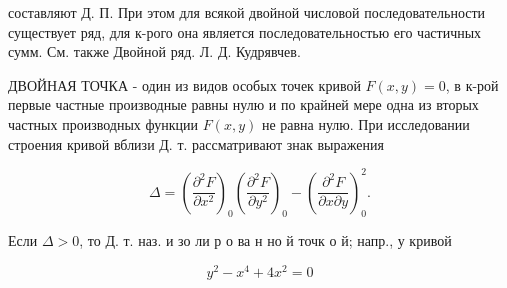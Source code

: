 \documentclass[10pt]{article}
\begin{document}
составляют Д. П. При этом для всякой двойной числовой последовательности существует ряд, для к-рого она является последовательностью его частичных сумм. См. также Двойной ряд. Л. Д. Кудрявчев.



ДВОЙНАЯ ТОЧКА - один из видов особых точек кривой $F(x, y)=0$, в к-рой первые частные производные равны нулю и по крайней мере одна из вторых частных производных функции $F(x, y)$ не равна нулю. При исследовании строения кривой вблизи Д. т. рассматривают знак выражения



\[

\Delta=\left(\frac{\partial^{2} F}{\partial x^{2}}\right)_{0}\left(\frac{\partial^{2} F}{\partial y^{2}}\right)_{0}-\left(\frac{\partial^{2} F}{\partial x \partial y}\right)_{0}^{2} .

\]



Если $\Delta>0$, то Д. т. наз. и зо ли р о ва н но й точк о й; напр., у кривой



\[

y^{2}-x^{4}+4 x^{2}=0

\]
\end{document}
